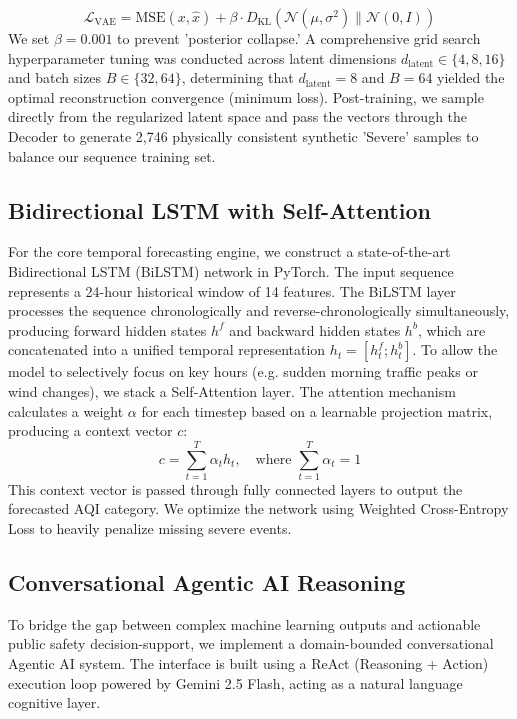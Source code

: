 \documentclass[conference]{IEEEtran}
\begin{document}
\begin{equation}
\mathcal{L}_{\text{VAE}} = \text{MSE}(x, \hat{x}) + \beta \cdot D_{\text{KL}}(\mathcal{N}(\mu, \sigma^2) \parallel \mathcal{N}(0, I))
\end{equation}
We set $\beta = 0.001$ to prevent 'posterior collapse.' A comprehensive grid search hyperparameter tuning was conducted across latent dimensions $d_{\text{latent}} \in \{4, 8, 16\}$ and batch sizes $B \in \{32, 64\}$, determining that $d_{\text{latent}} = 8$ and $B = 64$ yielded the optimal reconstruction convergence (minimum loss). Post-training, we sample directly from the regularized latent space and pass the vectors through the Decoder to generate 2,746 physically consistent synthetic 'Severe' samples to balance our sequence training set.

\subsection{Bidirectional LSTM with Self-Attention}
For the core temporal forecasting engine, we construct a state-of-the-art Bidirectional LSTM (BiLSTM) network in PyTorch. The input sequence represents a 24-hour historical window of 14 features. The BiLSTM layer processes the sequence chronologically and reverse-chronologically simultaneously, producing forward hidden states $h^f$ and backward hidden states $h^b$, which are concatenated into a unified temporal representation $h_t = [h^f_t; h^b_t]$. To allow the model to selectively focus on key hours (e.g. sudden morning traffic peaks or wind changes), we stack a Self-Attention layer. The attention mechanism calculates a weight $\alpha$ for each timestep based on a learnable projection matrix, producing a context vector $c$:
\begin{equation}
c = \sum_{t=1}^{T} \alpha_t h_t, \quad \text{where } \sum_{t=1}^{T} \alpha_t = 1
\end{equation}
This context vector is passed through fully connected layers to output the forecasted AQI category. We optimize the network using Weighted Cross-Entropy Loss to heavily penalize missing severe events.

\subsection{Conversational Agentic AI Reasoning}
To bridge the gap between complex machine learning outputs and actionable public safety decision-support, we implement a domain-bounded conversational Agentic AI system. The interface is built using a ReAct (Reasoning + Action) execution loop powered by Gemini 2.5 Flash, acting as a natural language cognitive layer.
\end{document}
